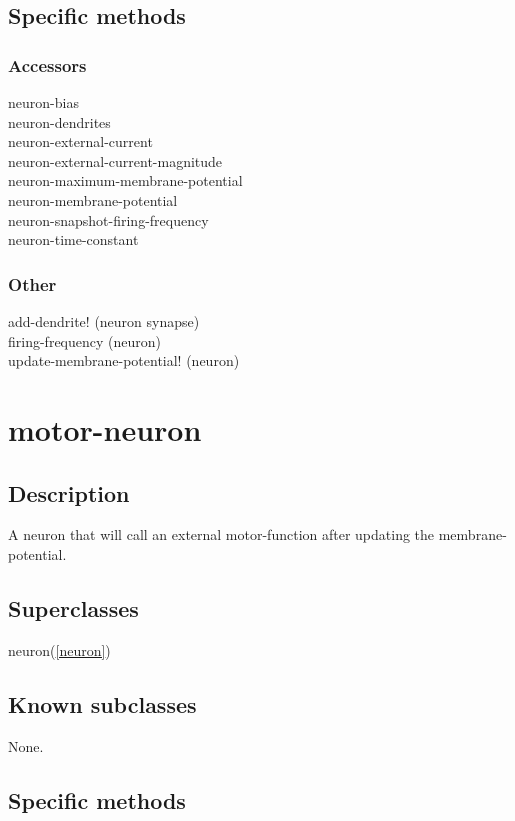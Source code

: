 \documentclass[english]{article}
\begin{document}
\subsection{Specific methods}

\subsubsection{Accessors}
neuron-bias\\
neuron-dendrites\\
neuron-external-current\\
neuron-external-current-magnitude\\
neuron-maximum-membrane-potential\\
neuron-membrane-potential\\
neuron-snapshot-firing-frequency\\
neuron-time-constant\\

\subsubsection{Other}
add-dendrite! (neuron synapse)\\
firing-frequency (neuron)\\
update-membrane-potential! (neuron)\\


\newpage
\section{motor-neuron}
\label{motor-neuron}

\subsection{Description}
A neuron that will call an external motor-function after updating the membrane-potential.

\subsection{Superclasses}
neuron(\ref{neuron})

\subsection{Known subclasses}
None.

\subsection{Specific methods}
\end{document}
